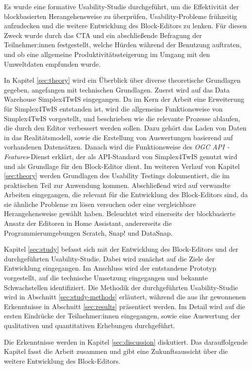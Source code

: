 Es wurde eine formative Usability-Studie durchgeführt, um die Effektivität der blockbasierten Herangehensweise zu überprüfen, Usability-Probleme frühzeitig aufzudecken und die weitere Entwicklung des Block-Editors zu lenken. Für diesen Zweck wurde durch das \acf{CTA} und ein abschließende Befragung der Teilnehmer:innen festgestellt, welche Hürden während der Benutzung auftraten, und ob eine allgemeine Produktivitätssteigerung im Umgang mit den Umweltdaten empfunden wurde.

\pskip
In Kapitel \ref{sec:theory} wird ein Überblick über diverse theoretische Grundlagen gegeben, angefangen mit technischen Grundlagen. Zuerst wird auf das Data Warehouse Simplex4TwIS eingegangen. Da im Kern der Arbeit eine Erweiterung für Simplex4TwIS entstanden ist, wird die allgemeine Funktionsweise von Simplex4TwIS vorgestellt, und beschrieben wie die relevante Prozesse ablaufen, die durch den Editor verbessert werden sollen. Dazu gehört das Laden von Daten in das Realitätsmodell, sowie die Erstellung von Auswertungen basierend auf vorhandenen Datensätzen. Danach wird die Funktionsweise des \textit{\acs{OGC} \acs{API} - Features}-Dienst erklärt, der als \acs{API}-Standard von Simplex4TwIS genutzt wird und als Grundlage für den Block-Editor dient. Im weiteren Verlauf von Kapitel \ref{sec:theory} werden Grundlagen des Usability Testings dokumentiert, die im praktischen Teil zur Anwendung kommen. Abschließend wird auf verwandte Arbeiten eingegangen, die relevant für die Entwicklung des Block-Editors sind, da sie ähnliche Probleme zu lösen versuchen oder eine vergleichbare Herangehensweise gewählt haben. Beleuchtet wird einerseits der blockbasierte Ansatz der Editoren in Home Assistant, andererseits die Programmierumgebungen Scratch, Snap! und DataSnap.

Kapitel \ref{sec:study} befasst sich mit der Entwicklung des Block-Editors und der durchgeführten Usability-Studie. Dabei wird zunächst auf die Ziele der Entwicklung eingegangen. Im Anschluss wird der entstandene Prototyp vorgestellt, auf die technische Umsetzung eingegangen und bekannte Schwachstellen identifiziert. Die Methodik der durchgeführten Usability-Studie wird in Abschnitt \ref{sec:study-methods} erläutert, während die aus ihr gewonnenen Erkenntnisse in Abschnitt \ref{sec:results} präsentiert werden. Im Detail wird auf die ersten Eindrücke der Teilnehmer:innen eingegangen, sowie eine Auswertung der qualitativen und quantitativen Erhebungen durchgeführt.

Die Erkenntnisse werden in Kapitel \ref{sec:discussion} diskutiert. Das darauffolgende Kapitel fasst die Arbeit zusammen und gibt eine Zukunftsaussicht über die weitere Entwicklung des Block-Editors.
